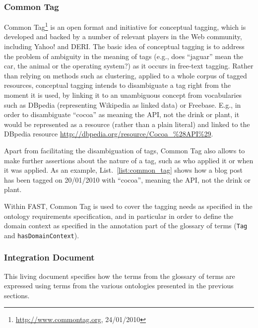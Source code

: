 \documentclass{fast_latex}
\begin{document}
\subsubsection{Common Tag} %
\label{ssub:common_tag}

Common Tag\footnote{\url{http://www.commontag.org}, 24/01/2010} is an open format and initiative for conceptual tagging, which is developed and backed by a number of relevant players in the Web community, including Yahoo! and DERI. The basic idea of conceptual tagging is to address the problem of ambiguity in the meaning of tags (e.g., does ``jaguar'' mean the car, the animal or the operating system?) as it occurs in free-text tagging. Rather than relying on methods such as clustering, applied to a whole corpus of tagged resources, conceptual tagging intends to disambiguate a tag right from the moment it is used, by linking it to an unambiguous concept from vocabularies such as DBpedia (representing Wikipedia as linked data) or Freebase. E.g., in order to disambiguate ``cocoa'' as meaning the API, not the drink or plant, it would be represented as a resource (rather than a plain literal) and linked to the DBpedia resource \url{http://dbpedia.org/resource/Cocoa_%28API%29}.

Apart from facilitating the disambiguation of tags, Common Tag also allows to make further assertions about the nature of a tag, such as who applied it or when it was applied. As an example, List.~\ref{list:common_tag} shows how a blog post has been tagged on 20/01/2010 with ``cocoa'', meaning the API, not the drink or plant.

\singlespacing
{}
\begin{figure}[ht]
	
\end{figure}
\doublespacing

Within FAST, Common Tag is used to cover the tagging needs as specified in the ontology requirements specification, and in particular in order to define the domain context as specified in the annotation part of the glossary of terms (\texttt{Tag} and \texttt{hasDomainContext}).


\subsubsection{Integration Document} %
\label{ssub:integration_document}
%
This living document specifies how the terms from the glossary of terms are expressed using terms from the various ontologies presented in the previous sections.
\end{document}
